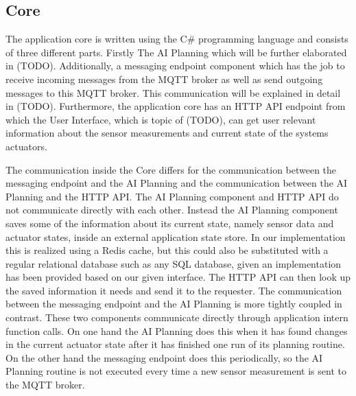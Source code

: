 \subsection{Core}
The application core is written using the C\# programming language and consists of three different parts. Firstly The AI Planning which will be further elaborated in (TODO). Additionally, a messaging endpoint component which has the job to receive incoming messages from the MQTT broker as well as send outgoing messages to this MQTT broker. This communication will be explained in detail in (TODO). Furthermore, the application core has an HTTP API endpoint from which the User Interface, which is topic of (TODO), can get user relevant information about the sensor measurements and current state of the systems actuators.

The communication inside the Core differs for the communication between the messaging endpoint and the AI Planning and the communication between the AI Planning and the HTTP API.
The AI Planning component and HTTP API do not communicate directly with each other. Instead the AI Planning component saves some of the information about its current state, namely sensor data and actuator states, inside an external application state store. In our implementation this is realized using a Redis cache, but this could also be substituted with a regular relational database such as any SQL database, given an implementation has been provided based on our given interface. The HTTP API can then look up the saved information it needs and send it to the requester.
The communication between the messaging endpoint and the AI Planning is more tightly coupled in contrast. These two components communicate directly through application intern function calls. On one hand the AI Planning does this when it has found changes in the current actuator state after it has finished one run of its planning routine. On the other hand the messaging endpoint does this periodically, so the AI Planning routine is not executed every time a new sensor measurement is sent to the MQTT broker.
